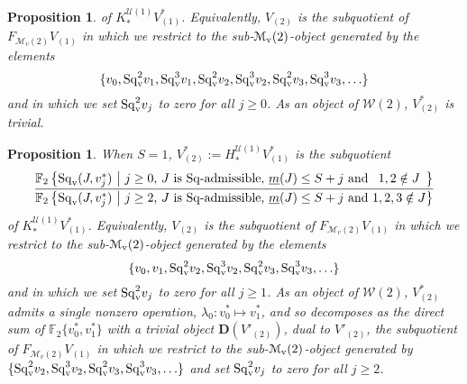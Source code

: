 \documentclass[11pt]{amsart}
\theoremstyle{plain}
\newtheorem{prop}[thm]{Proposition}
\theoremstyle{definition}
\newcommand{\calW}{\mathcal{W}}
\newcommand{\calU}{\mathcal{U}}
\newcommand{\calM}{\mathcal{M}}
\newcommand{\calMv}{\mathcal{M}_\textup{v}}
\theoremstyle{plain}
\newcommand{\minDimSq}{\underline{m}}
\newcommand{\Sq}{\mathrm{Sq}}
\newcommand{\Sqv}{\mathrm{Sq}_\textup{v}}
\newcommand{\F}{\mathbb{F}}
\newcommand{\dual}{\mathbf{D}}
\begin{document}
\begin{Calculations of HWn for n nonzero}
\begin{prop}
 of $K_*^{\calU(1)}V^*_{(1)}$. Equivalently, $V_{(2)}$ is the subquotient of $F_{\calM_v(2)}V_{(1)}$ in which we restrict to the sub-$\calMv(2)$-object generated by the elements%
\[\{v_0,\Sqv^2v_{1},\Sqv^3v_{1},\Sqv^2v_{2},\Sqv^3v_{2},\Sqv^2v_{3},\Sqv^3v_{3},\ldots\}\]
and in which we set $\Sqv^2 v_{j}$ to zero for all $j\geq0$.   As an object of $\calW(2)$, $V^*_{(2)}$ is trivial.
\end{prop}
\begin{prop}\label{Se1 calc of V2}
When $S=1$, $V^*_{(2)}:=H_*^{\calU(1)}V^*_{(1)}$ is the subquotient
\[\frac{{\F_{2}\left\{\Sq_{\textup{v}}(J,v_j^*)\ \middle|\ \makebox[\widthof{$\textup{$j\geq2$}$}][c]{$\textup{$j\geq0$}$}\textup{, $J$ is $\Sq$-admissible, $\minDimSq(J)\leq S+j$ and}\makebox[\widthof{$\textup{ $1,2,3\notin J$}$}][c]{$\textup{ $1,2\notin J$}$}\right\}}}{{\F_{2}\left\{\Sq_{\textup{v}}(J,v_j^*)\ \middle|\ \makebox[\widthof{$\textup{$j\geq2$}$}][c]{$\textup{$j\geq2$}$}\textup{, $J$ is $\Sq$-admissible, $\minDimSq(J)\leq S+j$ and}\makebox[\widthof{$\textup{ $1,2,3\notin J$}$}][c]{$\textup{ $1,2,3\notin J$}$}\right\}}}\]
 of $K_*^{\calU(1)}V^*_{(1)}$. Equivalently, $V_{(2)}$ is the subquotient of $F_{\calM_v(2)}V_{(1)}$ in which we restrict to the sub-$\calMv(2)$-object generated by the elements%
\[\{v_0,v_1,\Sqv^2v_{2},\Sqv^3v_{2},\Sqv^2v_{3},\Sqv^3v_{3},\ldots\}\]
and in which we set $\Sqv^2 v_{j}$ to zero for all $j\geq1$.  As an object of $\calW(2)$, $V^*_{(2)}$ admits a single nonzero operation, $\lambda_0:v_0^*\longmapsto v_1^*$, and so decomposes as the direct sum of
$\F_2\{v_0^*,v_1^*\}$ with a trivial object $\dual(V'_{(2)})$, dual to $V'_{(2)}$, the subquotient of $F_{\calM_v(2)}V_{(1)}$ in which we restrict to the sub-$\calMv(2)$-object generated by
$\{\Sqv^2v_{2},\Sqv^3v_{2},\Sqv^2v_{3},\Sqv^3v_{3},\ldots\}$ and set $\Sqv^2 v_{j}$ to zero for all $j\geq2$.
\end{prop}
%

\end{Calculations of HWn for n nonzero}
\end{document}
